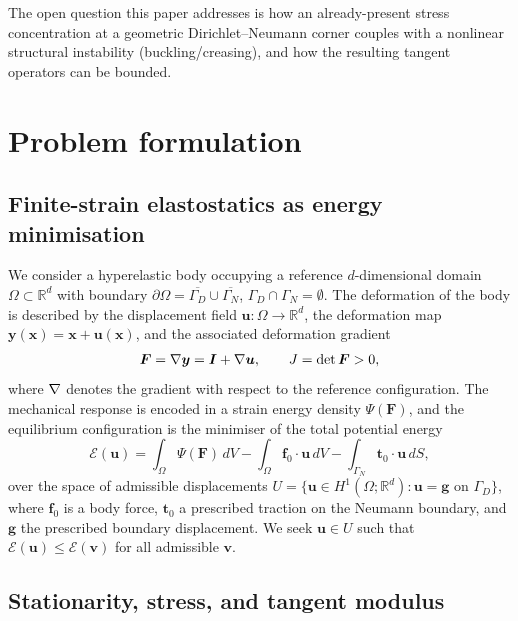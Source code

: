 \noindent The open question this paper addresses is how an already-present stress concentration at a geometric
Dirichlet--Neumann corner couples with a nonlinear structural instability (buckling/creasing), and how the resulting
tangent operators can be bounded.

\section{Problem formulation}
\label{sec:formulation}

\subsection{Finite-strain elastostatics as energy minimisation}

We consider a hyperelastic body occupying a reference $d$-dimensional domain $\Omega \subset \mathbb{R}^d$ with
boundary $\partial\Omega = \overline{\Gamma_D} \cup \overline{\Gamma_N}$, $\Gamma_D \cap \Gamma_N = \emptyset$. The
deformation of the body is described by the displacement field $\bm{u} : \Omega \to \mathbb{R}^d$, the deformation map
$\bm{y}(\bm{x}) = \bm{x} + \bm{u}(\bm{x})$, and the associated deformation gradient
\begin{equation}
    \bm{F} = \nabla \bm{y} = \bm{I} + \nabla \bm{u}, \qquad J = \det \bm{F} > 0,
\end{equation}
where $\nabla$ denotes the gradient with respect to the reference configuration. The mechanical response is encoded
in a strain energy density $\Psi(\bm{F})$, and the equilibrium configuration is the minimiser of the total potential
energy
\begin{equation}
    \label{eq:totalenergy}
    \mathcal{E}(\bm{u}) = \int_\Omega \Psi(\bm{F})\,dV - \int_\Omega \bm{f}_0 \cdot \bm{u} \,dV - \int_{\Gamma_N} \bm{t}_0 \cdot \bm{u} \,dS,
\end{equation}
over the space of admissible displacements $U = \{ \bm{u} \in H^1(\Omega;\mathbb{R}^d) : \bm{u} = \bm{g} \text{ on } \Gamma_D \}$,
where $\bm{f}_0$ is a body force, $\bm{t}_0$ a prescribed traction on the Neumann boundary, and $\bm{g}$ the prescribed
boundary displacement. We seek $\bm{u} \in U$ such that $\mathcal{E}(\bm{u}) \le \mathcal{E}(\bm{v})$ for all admissible
$\bm{v}$.

\subsection{Stationarity, stress, and tangent modulus}

